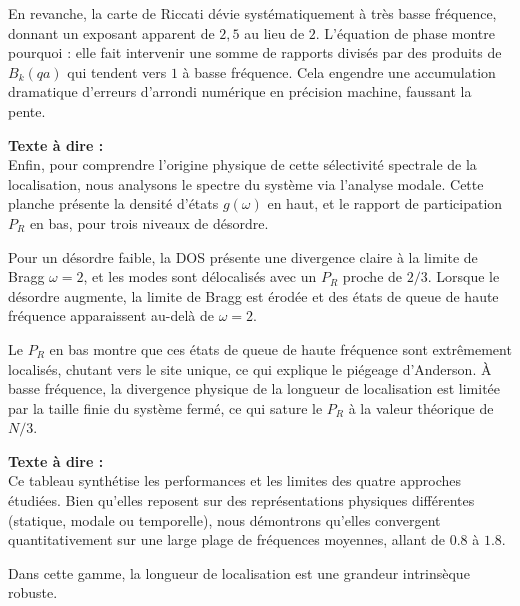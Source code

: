 \documentclass[11pt,a4paper]{article}
\begin{document}
\begin{tcolorbox}[colback=blue!5,colframe=blue!75!black,title=Slide 2 : Table des Matières --- 0:45 à 1:15]
\begin{tcolorbox}[colback=blue!5,colframe=blue!75!black,title=Slide 9 : Validation de la Théorie Perturbative (Derrida \& Gardner) --- 7:30 à 8:45]
En revanche, la carte de Riccati dévie systématiquement à très basse fréquence, donnant un exposant apparent de $2{,}5$ au lieu de $2$. L'équation de phase montre pourquoi : elle fait intervenir une somme de rapports divisés par des produits de $B_k(qa)$ qui tendent vers $1$ à basse fréquence. Cela engendre une accumulation dramatique d'erreurs d'arrondi numérique en précision machine, faussant la pente. \fg{}
\end{tcolorbox}

\newpage

\begin{tcolorbox}[colback=blue!5,colframe=blue!75!black,title=Slide 10 : Densité d'États (DOS) \& Rapport de Participation (PR) --- 8:45 à 10:00]
\textbf{Texte à dire :} \\
\og Enfin, pour comprendre l'origine physique de cette sélectivité spectrale de la localisation, nous analysons le spectre du système via l'analyse modale. Cette planche présente la densité d'états $g(\omega)$ en haut, et le rapport de participation $P_R$ en bas, pour trois niveaux de désordre. 

Pour un désordre faible, la DOS présente une divergence claire à la limite de Bragg $\omega = 2$, et les modes sont délocalisés avec un $P_R$ proche de $2/3$. Lorsque le désordre augmente, la limite de Bragg est érodée et des états de queue de haute fréquence apparaissent au-delà de $\omega = 2$. 

Le $P_R$ en bas montre que ces états de queue de haute fréquence sont extrêmement localisés, chutant vers le site unique, ce qui explique le piégeage d'Anderson. À basse fréquence, la divergence physique de la longueur de localisation est limitée par la taille finie du système fermé, ce qui sature le $P_R$ à la valeur théorique de $N/3$. \fg{}
\end{tcolorbox}

\begin{tcolorbox}[colback=blue!5,colframe=blue!75!black,title=Slide 11 : Synthèse des Méthodes Numériques --- 10:00 à 11:00]
\textbf{Texte à dire :} \\
\og  Ce tableau synthétise les performances et les limites des quatre approches étudiées. Bien qu'elles reposent sur des représentations physiques différentes (statique, modale ou temporelle), nous démontrons qu'elles convergent quantitativement sur une large plage de fréquences moyennes, allant de $0.8$ à $1.8$. 

Dans cette gamme, la longueur de localisation est une grandeur intrinsèque robuste. 


\end{tcolorbox}
\end{tcolorbox}
\end{document}

